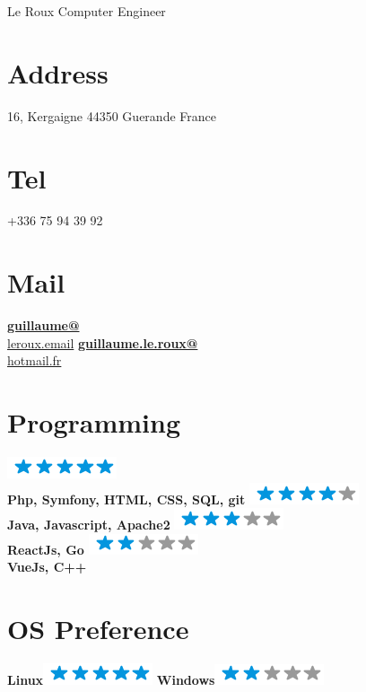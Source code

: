 \documentclass{friggeri-cv}
\begin{document}
 {Le Roux}
      {Computer Engineer}


\begin{aside}
	\section{Address}
	16, Kergaigne
	44350 Guerande
	France
	~
	\section{Tel}
	+336 75 94 39 92
	~
	\section{Mail}
	\href{mailto:guillaume@leroux.email}{\textbf{guillaume@}\\leroux.email}
	\href{mailto:guillaume.le.roux@hotmail.fr}{\textbf{guillaume.le.roux@}\\hotmail.fr}
	~
	\section{Programming}
	\includegraphics[scale=0.40]{img/5stars.png}\\\textbf{Php, Symfony, HTML, CSS, SQL, git}
	\includegraphics[scale=0.40]{img/4stars.png}\\\textbf{Java, Javascript, Apache2}
	\includegraphics[scale=0.40]{img/3stars.png}\\\textbf{ReactJs, Go}
	\includegraphics[scale=0.40]{img/2stars.png}\\\textbf{VueJs, C++}
	~
	\section{OS Preference}
	\textbf{Linux}\includegraphics[scale=0.40]{img/5stars.png}
	\textbf{Windows}\includegraphics[scale=0.40]{img/2stars.png}
	~

\end{aside}
\end{document}
